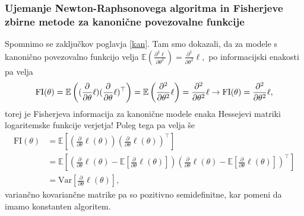 \documentclass[12pt,a4paper]{amsart}
\theoremstyle{definition} %
\theoremstyle{plain} %
\begin{document}

\subsubsection{Ujemanje Newton-Raphsonovega algoritma in Fisherjeve zbirne metode za kanonične povezovalne funkcije}
Spomnimo se zaključkov poglavja \ref{kan}. Tam smo dokazali, da za modele s kanonično povezovalno funkcijo velja $\mathbb{E}(\frac{\partial^2\ell}{\partial\theta^2}) = \frac{\partial^2}{\partial\theta^2}\ell,$
po informacijski enakosti pa velja 
\begin{equation*}
    \mathrm{FI}(\theta) = \mathbb{E}\left((\frac{\partial}{\partial\theta} \ell)(\frac{\partial}{\partial\theta} \ell)^\top\right) = \mathbb{E}\left(\frac{\partial^2}{\partial\theta^2}\ell\right) = \frac{\partial^2}{\partial\theta^2}\ell \\
    \rightarrow \mathrm{FI}(\theta) = \frac{\partial^2}{\partial\theta^2}\ell,
\end{equation*}
torej je Fisherjeva informacija za kanonične modele enaka Hessejevi matriki logaritemske funkcije verjetja! Poleg tega pa velja še
\begin{align}
    \mathrm{FI}(\theta) &= \mathbb{E}[(\frac{\partial}{\partial\theta} \ell(\theta))(\frac{\partial}{\partial\theta} \ell(\theta))^\top] \nonumber\\
    &= \mathbb{E}[\left(\frac{\partial}{\partial\theta} \ell(\theta) - \mathbb{E}[\frac{\partial}{\partial\theta} \ell(\theta)]\right)\left(\frac{\partial}{\partial\theta} \ell(\theta) - \mathbb{E}[\frac{\partial}{\partial\theta} \ell(\theta)]\right)^\top] \nonumber \\
    &= \mathrm{Var}[\frac{\partial}{\partial\theta} \ell(\theta)],
\end{align}
variančno kovariančne matrike pa so pozitivno semidefinitne, kar pomeni da imamo konstanten algoritem.
\end{document}

